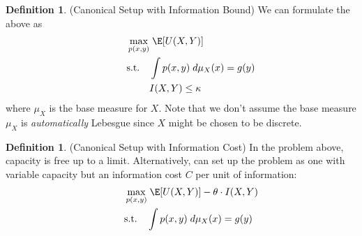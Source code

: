 \documentclass[12pt]{article}
\theoremstyle{plain}
\theoremstyle{definition}
\newtheorem{defn}[thm]{Definition}
\theoremstyle{remark}
\begin{document}
\begin{defn}(Canonical Setup with Information Bound)
We can formulate the above as
\begin{align*}
  \max_{p(x,y)}
  &\;\E[U(X,Y)]
  \\
  \qquad \text{s.t.}\quad
  &
  \int p(x,y)\;d\mu_X(x)
  = g(y)
  \\
  &
  I(X,Y)
  \leq \kappa
\end{align*}
where $\mu_X$ is the base measure for $X$.
Note that we don't assume the base measure $\mu_X$ is
\emph{automatically} Lebesgue since $X$ might be chosen to be discrete.
\end{defn}

\begin{defn}(Canonical Setup with Information Cost)
In the problem above, capacity is free up to a limit.
Alternatively, can set up the problem as one with variable capacity but
an information cost $C$ per unit of information:
\begin{align*}
  \max_{p(x,y)}
  &\;\E[U(X,Y)]
  -
  \theta \cdot I(X,Y)
  \\
  \qquad \text{s.t.}\quad
  &
  \int
  p(x,y)\;d\mu_X(x)
  = g(y)
\end{align*}
\end{defn}
\end{document}
